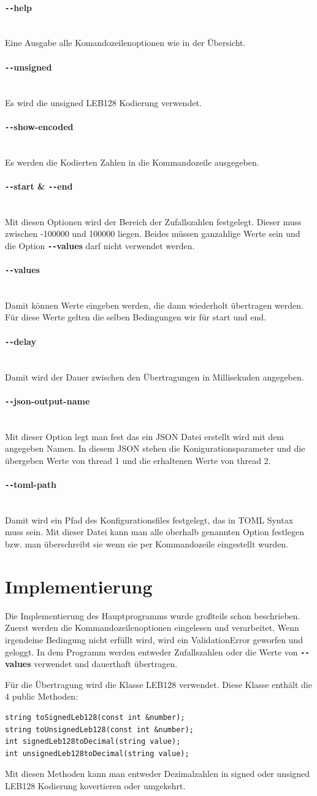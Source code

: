 \documentclass{article}
\newcommand{\newlineparagraph}[1]{\paragraph{#1}\mbox{}\\}
\newcommand{\twodashes}{\texttt{-{}-}}
\begin{document}
\newlineparagraph{\twodashes help}
Eine Ausgabe alle Komandozeilenoptionen wie in der Übersicht.
\newlineparagraph{\twodashes unsigned}
Es wird die unsigned LEB128 Kodierung verwendet.
\newlineparagraph{\twodashes show-encoded}
Es werden die Kodierten Zahlen in die Kommandozeile ausgegeben.
\newlineparagraph{\twodashes start \& \twodashes end}
Mit diesen Optionen wird der Bereich der Zufallszahlen festgelegt. Dieser muss zwischen -100000 und 100000 liegen. Beides müssen ganzahlige Werte sein und die Option \textbf{\twodashes values} darf nicht verwendet werden.
\newlineparagraph{\twodashes values}
Damit können Werte eingeben werden, die dann wiederholt übertragen werden. Für diese Werte gelten die selben Bedingungen wir für start und end. 
\newlineparagraph{\twodashes delay}
Damit wird der Dauer zwischen den Übertragungen in Millisekuden angegeben.
\newlineparagraph{\twodashes json-output-name}
Mit dieser Option legt man fest das ein JSON Datei erstellt wird mit dem angegeben Namen.
In diesem JSON stehen die Konigurationsparameter und die übergeben Werte von thread 1 und die erhaltenen Werte von thread 2.
\newlineparagraph{\twodashes toml-path}
Damit wird ein Pfad des Konfigurationsfiles festgelegt, das in TOML Syntax muss sein. Mit dieser Datei kann man alle oberhalb genannten Option festlegen bzw. man überschreibt sie wenn sie per Kommandozeile eingestellt wurden.

\section{Implementierung}
Die Implementierung des Hauptprogramms wurde großteils schon beschrieben. Zuerst werden die Kommandozeilenoptionen eingelesen und verarbeitet. Wenn irgendeine Bedingung nicht erfüllt wird, wird ein ValidationError geworfen und geloggt. In dem Programm werden entweder Zufallszahlen oder die Werte von \textbf{\twodashes values} verwendet und dauerthaft übertragen.
\pagebreak

Für die Übertragung wird die Klasse LEB128 verwendet. Diese Klasse enthält die 4 public Methoden:
\begin{verbatim}
string toSignedLeb128(const int &number);
string toUnsignedLeb128(const int &number);
int signedLeb128toDecimal(string value);
int unsignedLeb128toDecimal(string value);
\end{verbatim}

Mit diesen Methoden kann man entweder Dezimalzahlen in signed oder unsigned LEB128 Kodierung kovertieren oder umgekehrt.
\end{document}
